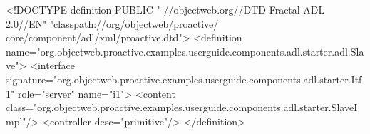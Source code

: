 <!DOCTYPE definition PUBLIC "-//objectweb.org//DTD Fractal ADL 2.0//EN" "classpath://org/objectweb/proactive/ core/component/adl/xml/proactive.dtd">
<definition name="org.objectweb.proactive.examples.userguide.components.adl.starter.adl.Slave">
<interface signature="org.objectweb.proactive.examples.userguide.components.adl.starter.Itf1" role="server" name="i1">
<content class="org.objectweb.proactive.examples.userguide.components.adl.starter.SlaveImpl"/>
<controller desc="primitive"/> 
</definition>